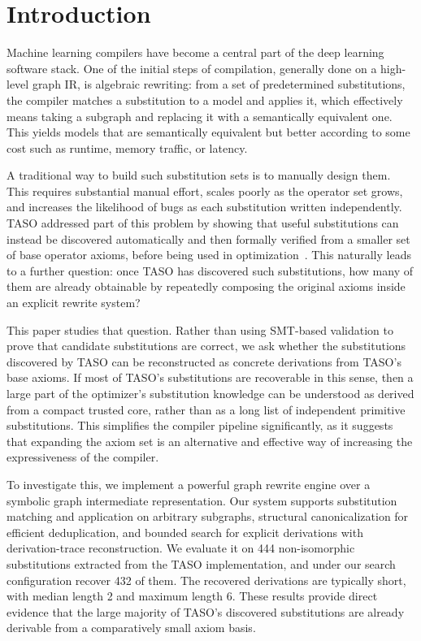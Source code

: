 \documentclass[sigplan,10pt,nonacm]{acmart}
\begin{document}
\section{Introduction}

Machine learning compilers have become a central part of the deep learning software stack. One of the initial steps of compilation, generally done on a high-level graph IR, is algebraic rewriting: from a set of predetermined substitutions, the compiler matches a substitution to a model and applies it, which effectively means taking a subgraph and replacing it with a semantically equivalent one. This yields models that are semantically equivalent but better according to some cost such as runtime, memory traffic, or latency.

A traditional way to build such substitution sets is to manually design them. This requires substantial manual effort, scales poorly as the operator set grows, and increases the likelihood of bugs as each substitution written independently. TASO addressed part of this problem by showing that useful substitutions can instead be discovered automatically and then formally verified from a smaller set of base operator axioms, before being used in optimization~\cite{jia2019taso}. This naturally leads to a further question: once TASO has discovered such substitutions, how many of them are already obtainable by repeatedly composing the original axioms inside an explicit rewrite system?

This paper studies that question. Rather than using SMT-based validation to prove that candidate substitutions are correct, we ask whether the substitutions discovered by TASO can be reconstructed as concrete derivations from TASO's base axioms. If most of TASO's substitutions are recoverable in this sense, then a large part of the optimizer's substitution knowledge can be understood as derived from a compact trusted core, rather than as a long list of independent primitive substitutions. This simplifies the compiler pipeline significantly, as it suggests that expanding the axiom set is an alternative and effective way of increasing the expressiveness of the compiler.

To investigate this, we implement a powerful graph rewrite engine over a symbolic graph intermediate representation. Our system supports substitution matching and application on arbitrary subgraphs, structural canonicalization for efficient deduplication, and bounded search for explicit derivations with derivation-trace reconstruction. We evaluate it on 444 non-isomorphic substitutions extracted from the TASO implementation, and under our search configuration recover 432 of them. The recovered derivations are typically short, with median length 2 and maximum length 6. These results provide direct evidence that the large majority of TASO's discovered substitutions are already derivable from a comparatively small axiom basis.
\end{document}
